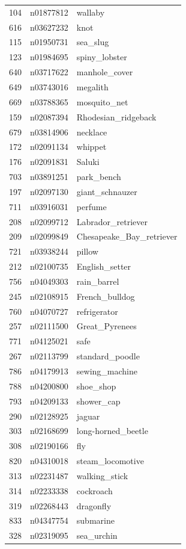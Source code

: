 \begin{table}
\begin{tabular}{cll}
104 & n01877812 & wallaby \\
616 & n03627232 & knot \\
115 & n01950731 & sea_slug \\
123 & n01984695 & spiny_lobster \\
640 & n03717622 & manhole_cover \\
649 & n03743016 & megalith \\
669 & n03788365 & mosquito_net \\
159 & n02087394 & Rhodesian_ridgeback \\
679 & n03814906 & necklace \\
172 & n02091134 & whippet \\
176 & n02091831 & Saluki \\
703 & n03891251 & park_bench \\
197 & n02097130 & giant_schnauzer \\
711 & n03916031 & perfume \\
208 & n02099712 & Labrador_retriever \\
209 & n02099849 & Chesapeake_Bay_retriever \\
721 & n03938244 & pillow \\
212 & n02100735 & English_setter \\
756 & n04049303 & rain_barrel \\
245 & n02108915 & French_bulldog \\
760 & n04070727 & refrigerator \\
257 & n02111500 & Great_Pyrenees \\
771 & n04125021 & safe \\
267 & n02113799 & standard_poodle \\
786 & n04179913 & sewing_machine \\
788 & n04200800 & shoe_shop \\
793 & n04209133 & shower_cap \\
290 & n02128925 & jaguar \\
303 & n02168699 & long-horned_beetle \\
308 & n02190166 & fly \\
820 & n04310018 & steam_locomotive \\
313 & n02231487 & walking_stick \\
314 & n02233338 & cockroach \\
319 & n02268443 & dragonfly \\
833 & n04347754 & submarine \\
328 & n02319095 & sea_urchin \\

\end{tabular}
\end{table}
